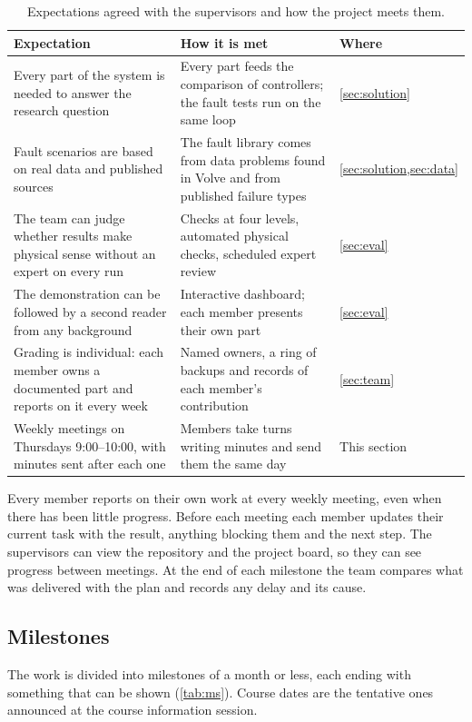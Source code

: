 \documentclass[11pt,letterpaper]{article}
\begin{document}
\begin{table}[!htbp]
\caption{Expectations agreed with the supervisors and how the project meets them.}\label{tab:expect}
\small
\begin{tabularx}{\textwidth}{@{}P{5.6cm}LP{2.2cm}@{}}
\toprule
\textbf{Expectation} & \textbf{How it is met} & \textbf{Where} \\
\midrule
Every part of the system is needed to answer the research question & Every part feeds the comparison of controllers; the fault tests run on the same loop & \cref{sec:solution} \\
Fault scenarios are based on real data and published sources & The fault library comes from data problems found in Volve and from published failure types & \cref{sec:solution,sec:data} \\
The team can judge whether results make physical sense without an expert on every run & Checks at four levels, automated physical checks, scheduled expert review & \cref{sec:eval} \\
The demonstration can be followed by a second reader from any background & Interactive dashboard; each member presents their own part & \cref{sec:eval} \\
Grading is individual: each member owns a documented part and reports on it every week & Named owners, a ring of backups and records of each member's contribution & \cref{sec:team} \\
Weekly meetings on Thursdays 9:00--10:00, with minutes sent after each one & Members take turns writing minutes and send them the same day & This section \\
\bottomrule
\end{tabularx}
\end{table}

Every member reports on their own work at every weekly meeting, even when there has been
little progress. Before each meeting each member updates their current task with the
result, anything blocking them and the next step. The supervisors can view the repository
and the project board, so they can see progress between meetings. At the end of each
milestone the team compares what was delivered with the plan and records any delay and
its cause.

\subsection{Milestones}

The work is divided into milestones of a month or less, each ending with something that
can be shown (\cref{tab:ms}). Course dates are the tentative ones announced at the course
information session.
\end{document}

